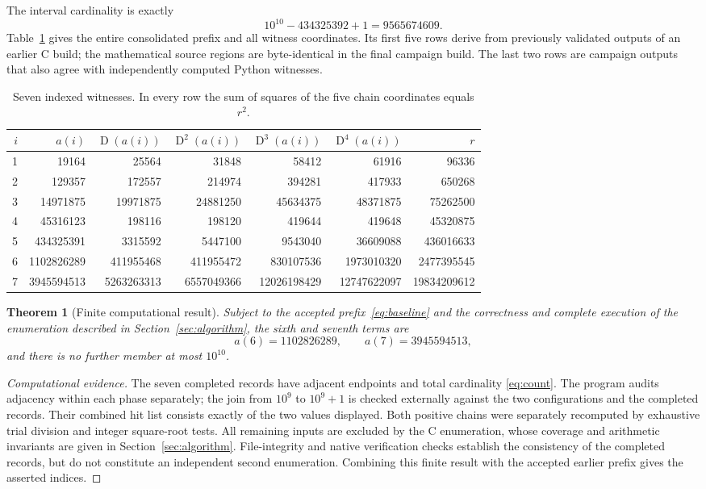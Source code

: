 \documentclass[11pt,a4paper]{article}
\newtheorem{theorem}{Theorem}
\theoremstyle{remark}
\newcommand{\D}{\operatorname{D}}
\begin{document}
The interval cardinality is exactly
\begin{equation}\label{eq:count}
10^{10}-434325392+1=9565674609.
\end{equation}
Table~\ref{tab:witnesses} gives the entire consolidated prefix and all witness
coordinates. Its first five rows derive from previously validated outputs of
an earlier C build; the mathematical source regions are byte-identical in
the final campaign build. The last two rows are campaign outputs that also
agree with independently computed Python witnesses.
\begin{table}[htbp]
\centering\scriptsize
\setlength{\tabcolsep}{3pt}
\begin{tabular}{rrrrrrr}
\toprule
$i$ & $a(i)$ & $\D(a(i))$ & $\D^2(a(i))$ & $\D^3(a(i))$ & $\D^4(a(i))$ & $r$\\
\midrule
1 & 19164 & 25564 & 31848 & 58412 & 61916 & 96336\\
2 & 129357 & 172557 & 214974 & 394281 & 417933 & 650268\\
3 & 14971875 & 19971875 & 24881250 & 45634375 & 48371875 & 75262500\\
4 & 45316123 & 198116 & 198120 & 419644 & 419648 & 45320875\\
5 & 434325391 & 3315592 & 5447100 & 9543040 & 36609088 & 436016633\\
6 & 1102826289 & 411955468 & 411955472 & 830107536 & 1973010320 & 2477395545\\
7 & 3945594513 & 5263263313 & 6557049366 & 12026198429 & 12747622097 & 19834209612\\
\bottomrule
\end{tabular}
\caption{Seven indexed witnesses. In every row the sum of squares of the
five chain coordinates equals $r^2$.}\label{tab:witnesses}
\end{table}

\begin{theorem}[Finite computational result]\label{thm:finite}
Subject to the accepted prefix~\eqref{eq:baseline} and the correctness and
complete execution of the enumeration described in Section~\ref{sec:algorithm},
the sixth and seventh terms are
\[
a(6)=1102826289,\qquad a(7)=3945594513,
\]
and there is no further member at most $10^{10}$.
\end{theorem}
\begin{proof}[Computational evidence]
The seven completed records have adjacent endpoints and total cardinality
\eqref{eq:count}. The program audits adjacency within each phase separately;
the join from $10^9$ to $10^9+1$ is checked externally against the two
configurations and the completed records. Their combined hit list consists exactly of the two values
displayed. Both positive chains were separately recomputed by exhaustive
trial division and integer square-root tests. All remaining inputs are
excluded by the C enumeration, whose coverage and arithmetic invariants are
given in Section~\ref{sec:algorithm}. File-integrity and native verification checks establish the
consistency of the completed records, but do not constitute an independent
second enumeration. Combining this finite result with the accepted earlier
prefix gives the asserted indices.
\end{proof}
\end{document}
